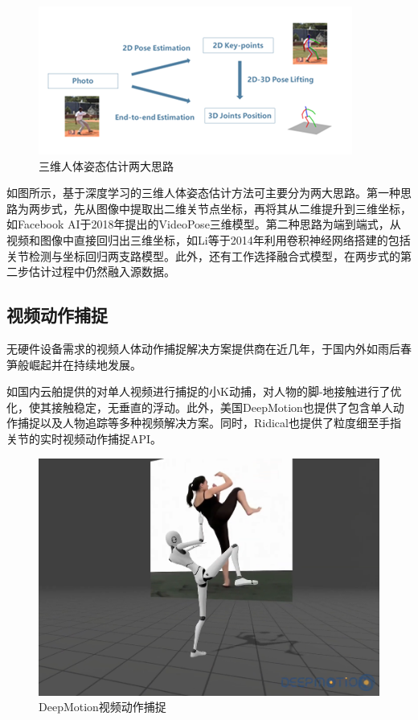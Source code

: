 \begin{figure}[h]
	\centering
	\includegraphics[scale=0.4]{figures/6.png}
	\caption{三维人体姿态估计两大思路}
	\label{fig:f6}
\end{figure}

如图所示，基于深度学习的三维人体姿态估计方法可主要分为两大思路。第一种思路为两步式，先从图像中提取出二维关节点坐标，再将其从二维提升到三维坐标，如Facebook AI于2018年提出的VideoPose三维模型。第二种思路为端到端式，从视频和图像中直接回归出三维坐标，如Li等于2014年利用卷积神经网络搭建的包括关节检测与坐标回归两支路模型。此外，还有工作选择融合式模型，在两步式的第二步估计过程中仍然融入源数据。

\subsection{视频动作捕捉}{}
无硬件设备需求的视频人体动作捕捉解决方案提供商在近几年，于国内外如雨后春笋般崛起并在持续地发展。

如国内云舶提供的对单人视频进行捕捉的小K动捕，对人物的脚-地接触进行了优化，使其接触稳定，无垂直的浮动。此外，美国DeepMotion也提供了包含单人动作捕捉以及人物追踪等多种视频解决方案。同时，Ridical也提供了粒度细至手指关节的实时视频动作捕捉API。

\begin{figure}[h]
	\centering
	\includegraphics[scale=0.4]{figures/7.png}
	\caption{DeepMotion视频动作捕捉}
	\label{fig:f7}
\end{figure}



